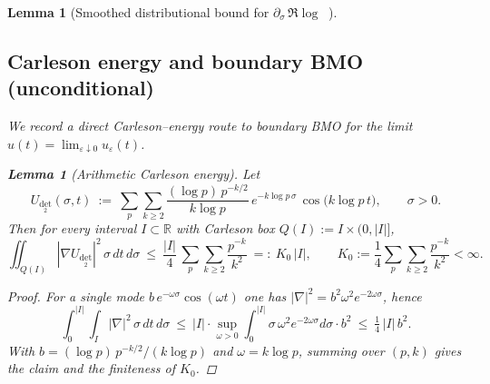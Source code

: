 \documentclass[11pt]{article}
\newtheorem{lemma}[theorem]{Lemma}
\theoremstyle{definition}
\theoremstyle{remark}
\newcommand{\R}{\mathbb{R}}
\DeclareMathOperator{\dettwo}{det_2}
\begin{document}
\begin{lemma}[Smoothed distributional bound for $\partial_\sigma\,\Re\log\dettwo$]
\subsection*{Carleson energy and boundary BMO (unconditional)}
We record a direct Carleson--energy route to boundary BMO for the limit $u(t)=\lim_{\varepsilon\downarrow 0}u_\varepsilon(t)$.

\begin{lemma}[Arithmetic Carleson energy]\label{lem:carleson-arith}
Let
\[
 U_{\det_2}(\sigma,t)\ :=\ \sum_{p}\sum_{k\ge 2}\frac{(\log p)\,p^{-k/2}}{k\log p}\,e^{-k\log p\,\sigma}\,\cos\big(k\log p\,t\big),\qquad \sigma>0.
\]
Then for every interval $I\subset\R$ with Carleson box $Q(I):=I\times(0,|I|]$,
\[
 \iint_{Q(I)} |\nabla U_{\det_2}|^2\,\sigma\,dt\,d\sigma\ \le\ \frac{|I|}{4}\,\sum_{p}\sum_{k\ge 2}\frac{p^{-k}}{k^2}
 \ =:\ K_0\,|I|,\qquad K_0:=\frac{1}{4}\sum_{p}\sum_{k\ge 2}\frac{p^{-k}}{k^2}<\infty.
\]
\end{lemma}
\begin{proof}
For a single mode $b\,e^{-\omega\sigma}\cos(\omega t)$ one has $|\nabla|^2=b^2\omega^2e^{-2\omega\sigma}$, hence
\[
 \int_0^{|I|}\!\int_I |\nabla|^2\,\sigma\,dt\,d\sigma\ \le\ |I|\cdot\sup_{\omega>0}\int_0^{|I|}\sigma\,\omega^2e^{-2\omega\sigma}d\sigma\cdot b^2\ \le\ \tfrac14\,|I|\,b^2.
\]
With $b=(\log p)\,p^{-k/2}/(k\log p)$ and $\omega=k\log p$, summing over $(p,k)$ gives the claim and the finiteness of $K_0$.
\end{proof}


\end{lemma}
\end{document}
